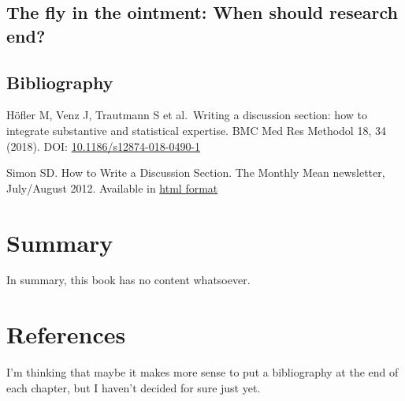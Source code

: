 \documentclass[
  letterpaper,
  DIV=11,
  numbers=noendperiod]{scrreprt}
\newlength{\cslhangindent}
\newenvironment{CSLReferences}[2] %
 {\begin{list}{}{%
  \setlength{\itemindent}{0pt}
  \setlength{\leftmargin}{0pt}
  \setlength{\parsep}{0pt}
  \ifodd #1
   \setlength{\leftmargin}{\cslhangindent}
   \setlength{\itemindent}{-1\cslhangindent}
  \fi
  \setlength{\itemsep}{#2\baselineskip}}}
 {\end{list}}
\begin{document}
\section{The fly in the ointment: When should research
end?}\label{the-fly-in-the-ointment-when-should-research-end}

\section{Bibliography}\label{bibliography-8}

Höfler M, Venz J, Trautmann S et al.~Writing a discussion section: how
to integrate substantive and statistical expertise. BMC Med Res Methodol
18, 34 (2018). DOI:
\href{https://doi.org/10.1186/s12874-018-0490-1}{10.1186/s12874-018-0490-1}

Simon SD. How to Write a Discussion Section. The Monthly Mean
newsletter, July/August 2012. Available in
\href{http://www.pmean.com/news/201207.html\#1}{html format}


\chapter{Summary}\label{summary}

In summary, this book has no content whatsoever.


\chapter*{References}\label{references}


\label{refs}
\begin{CSLReferences}{0}{1}
\end{CSLReferences}

I'm thinking that maybe it makes more sense to put a bibliography at the
end of each chapter, but I haven't decided for sure just yet.
\end{document}
